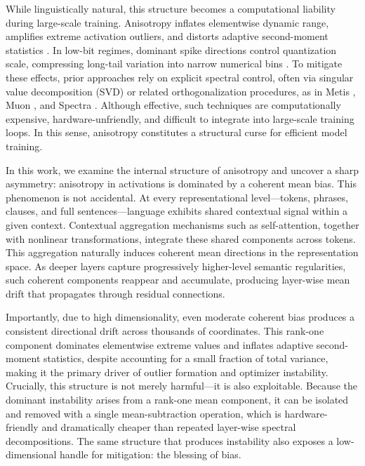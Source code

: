 While linguistically natural, this structure becomes a computational liability during large-scale training. Anisotropy inflates elementwise dynamic range, amplifies extreme activation outliers, and distorts adaptive second-moment statistics \citep{kingma2014, loshchilov2017, huang2026}. In low-bit regimes, dominant spike directions control quantization scale, compressing long-tail variation into narrow numerical bins \citep{xiao2023, frantar2023, lin2024, li2024, ashkboos2024}. To mitigate these effects, prior approaches rely on explicit spectral control, often via singular value decomposition (SVD) or related orthogonalization procedures, as in Metis \citep{cao2025}, Muon \citep{jordan2024}, and Spectra \citep{huang2026}. Although effective, such techniques are computationally expensive, hardware-unfriendly, and difficult to integrate into large-scale training loops. In this sense, anisotropy constitutes a structural curse for efficient model training.

In this work, we examine the internal structure of anisotropy and uncover a sharp asymmetry: anisotropy in activations is dominated by a coherent mean bias. This phenomenon is not accidental. At every representational level---tokens, phrases, clauses, and full sentences---language exhibits shared contextual signal within a given context. Contextual aggregation mechanisms such as self-attention, together with nonlinear transformations, integrate these shared components across tokens. This aggregation naturally induces coherent mean directions in the representation space. As deeper layers capture progressively higher-level semantic regularities, such coherent components reappear and accumulate, producing layer-wise mean drift that propagates through residual connections.

Importantly, due to high dimensionality, even moderate coherent bias produces a consistent directional drift across thousands of coordinates. This rank-one component dominates elementwise extreme values and inflates adaptive second-moment statistics, despite accounting for a small fraction of total variance, making it the primary driver of outlier formation and optimizer instability. Crucially, this structure is not merely harmful---it is also exploitable. Because the dominant instability arises from a rank-one mean component, it can be isolated and removed with a single mean-subtraction operation, which is hardware-friendly and dramatically cheaper than repeated layer-wise spectral decompositions. The same structure that produces instability also exposes a low-dimensional handle for mitigation: the blessing of bias.


